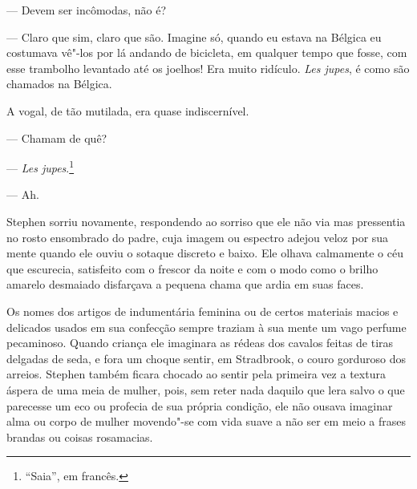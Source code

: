  --- Devem ser incômodas, não é?

 --- Claro que sim, claro que são. Imagine só, quando eu estava na Bélgica
eu costumava vê"-los por lá andando de bicicleta, em qualquer tempo que
fosse, com esse trambolho levantado até os joelhos! Era muito ridículo.
\textit{Les jupes}, é como são chamados na Bélgica.

A vogal, de tão mutilada, era quase indiscernível.

 --- Chamam de quê?

 --- \textit{Les jupes}.\footnote{ ``Saia'', em francês.}

 --- Ah.

Stephen sorriu novamente, respondendo ao sorriso que ele não via mas
pressentia no rosto ensombrado do padre, cuja imagem ou espectro adejou
veloz por sua mente quando ele ouviu o sotaque discreto e baixo. Ele
olhava calmamente o céu que escurecia, satisfeito com o frescor da
noite e com o modo como o brilho amarelo desmaiado disfarçava a pequena
chama que ardia em suas faces.

Os nomes dos artigos de indumentária feminina ou de certos materiais
macios e delicados usados em sua confecção sempre traziam à sua mente
um vago perfume pecaminoso. Quando criança ele imaginara as rédeas dos
cavalos feitas de tiras delgadas de seda, e fora um choque sentir, em
Stradbrook, o couro gorduroso dos arreios. Stephen também ficara
chocado ao sentir pela primeira vez a textura áspera de uma meia de
mulher, pois, sem reter nada daquilo que lera salvo o que parecesse um
eco ou profecia de sua própria condição, ele não ousava imaginar alma
ou corpo de mulher movendo"-se com vida suave a não ser em meio a frases
brandas ou coisas rosamacias. 

